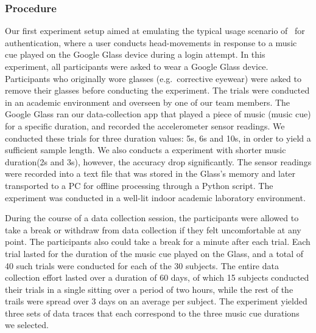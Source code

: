 \subsubsection{Procedure}
Our first experiment setup aimed at emulating the typical usage scenario
of \systemname~for authentication, where a user conducts head-movements in
response to a music cue played on the Google Glass device during a login
attempt.
In this experiment, all participants were asked to wear a Google Glass
device. Participants who originally wore glasses (e.g.~corrective eyewear) were asked to remove their
glasses before conducting the experiment.
The trials were conducted in an academic environment and overseen by one of
our team members.
The Google Glass ran our data-collection app that played a piece of
music (music cue) for a specific duration, and recorded the accelerometer
sensor readings. We conducted these trials for three duration values: 5s,
6s and 10s, in order to yield a sufficient sample length. We also conducts a experiment with shorter music duration(2s and 3s), however, the accuracy drop significantly. %
The sensor readings were recorded into a text file that was stored
in the Glass's memory and later transported to a PC for offline processing
through a Python script. The experiment was conducted in a well-lit indoor
academic laboratory environment.

During the course of a data collection session, the participants were allowed to take a
break or withdraw from data collection if they felt uncomfortable at any
point.%
The participants also could take a break for a minute after each trial.
Each trial lasted for the duration of the music cue played on the Glass, and
a total of 40 such trials were conducted for each of the 30 subjects.
The entire data collection effort lasted over a duration of 60 days, of which 15
subjects conducted their trials in a single sitting over a period of two
hours, while the rest of the trails were spread over 3 days on an average per
subject.
The experiment yielded three sets of data traces that each correspond to
the three music cue durations we selected.


